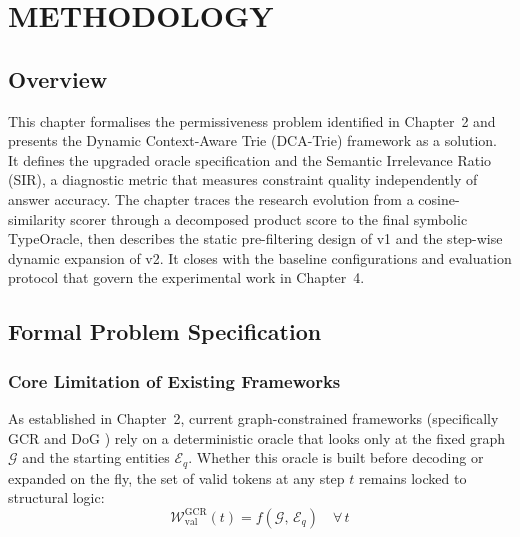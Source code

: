
\chapter{METHODOLOGY}
\label{Chapter3}

\section{Overview}
\label{sec:ch3intro}

This chapter formalises the permissiveness problem identified in Chapter~2 and presents the Dynamic Context-Aware Trie (DCA-Trie) framework as a solution. It defines the upgraded oracle specification and the Semantic Irrelevance Ratio (SIR), a diagnostic metric that measures constraint quality independently of answer accuracy. The chapter traces the research evolution from a cosine-similarity scorer through a decomposed product score to the final symbolic TypeOracle, then describes the static pre-filtering design of v1 and the step-wise dynamic expansion of v2. It closes with the baseline configurations and evaluation protocol that govern the experimental work in Chapter~4.

\section{Formal Problem Specification}
\label{sec:ch3problem}

\subsection{Core Limitation of Existing Frameworks}

As established in Chapter~2, current graph-constrained frameworks (specifically GCR \citep{luo2025-graph-constrained-reasoning} and DoG \citep{li2024-decoding-on-graphs}) rely on a deterministic oracle that looks only at the fixed graph $\mathcal{G}$ and the starting entities $\mathcal{E}_q$. Whether this oracle is built before decoding or expanded on the fly, the set of valid tokens at any step $t$ remains locked to structural logic:
\begin{equation}
  \mathcal{W}_{\text{val}}^{\text{GCR}}(t) = f(\mathcal{G},\, \mathcal{E}_q)
  \quad \forall\, t
  \label{eq:gcr_oracle}
\end{equation}

